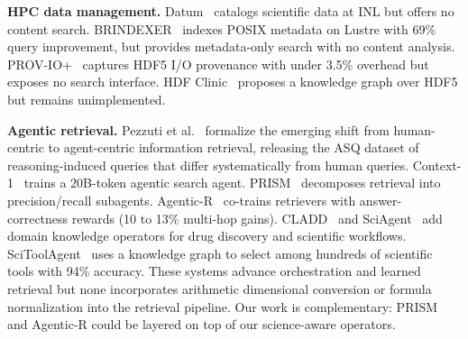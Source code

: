 \textbf{HPC data management.} Datum~\cite{datum2024} catalogs scientific data at INL but offers no content search. BRINDEXER~\cite{brindexer2020} indexes POSIX metadata on Lustre with 69\% query improvement, but provides metadata-only search with no content analysis. PROV-IO+~\cite{provio2024} captures HDF5 I/O provenance with under 3.5\% overhead but exposes no search interface. HDF Clinic~\cite{hdfclinic2025} proposes a knowledge graph over HDF5 but remains unimplemented.

\textbf{Agentic retrieval.} Pezzuti et al.~\cite{agentic_search_picture2026} formalize the emerging shift from human-centric to agent-centric information retrieval, releasing the ASQ dataset of reasoning-induced queries that differ systematically from human queries. Context-1~\cite{context1_2026} trains a 20B-token agentic search agent. PRISM~\cite{prism2025} decomposes retrieval into precision/recall subagents. Agentic-R~\cite{agenticr2026} co-trains retrievers with answer-correctness rewards (10 to 13\% multi-hop gains). CLADD~\cite{cladd2025} and SciAgent~\cite{sciagent2025} add domain knowledge operators for drug discovery and scientific workflows. SciToolAgent~\cite{scitoolagent2025} uses a knowledge graph to select among hundreds of scientific tools with 94\% accuracy. These systems advance orchestration and learned retrieval but none incorporates arithmetic dimensional conversion or formula normalization into the retrieval pipeline. Our work is complementary: PRISM and Agentic-R could be layered on top of our science-aware operators.

